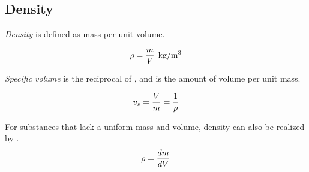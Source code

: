 \subsection{Density}\label{subsec:Density}
\begin{definition}[Density]\label{def:Density}
  \emph{Density} is defined as mass per unit volume.

  \begin{equation}\label{eq:Density}
    \Density = \frac{\Mass}{\Volume} \:\: \si[per-mode=symbol]{\kilo\gram\per\meter\cubed}
  \end{equation}
\end{definition}

\begin{definition}\label{def:Specific_Volume}
  \emph{Specific volume} is the reciprocal of , and is the amount of volume per unit mass.

  \begin{equation}\label{eq:Specific_Volume}
    \SpecificVolume = \frac{\Volume}{\Mass} = \frac{1}{\Density}
  \end{equation}
\end{definition}

For substances that lack a uniform mass and volume, density can also be realized by .
\begin{equation}\label{eq:Differential_Density}
  \Density = \frac{d \Mass}{d \Volume}
\end{equation}



